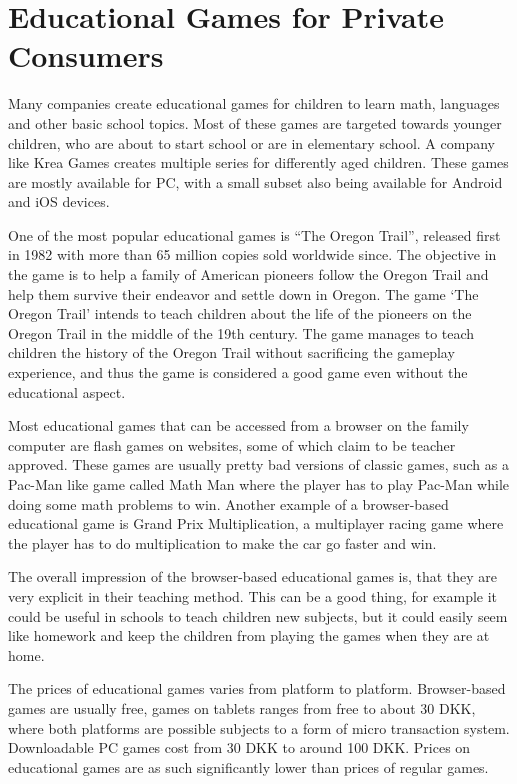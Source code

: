\section{Educational Games for Private Consumers}
\label{sec:privateconsumers}
Many companies create educational games for children to learn math, languages and other basic school topics. Most of these games are targeted towards younger children, who are about to start school or are in elementary school. A company like Krea Games \cite{kreagames} creates multiple series for differently aged children. These games are mostly available for PC, with a small subset also being available for Android and iOS devices.

One of the most popular educational games is ``The Oregon Trail'', released first in 1982 with more than 65 million copies sold worldwide since.\cite{oregontrail} The objective in the game is to help a family of American pioneers follow the Oregon Trail and help them survive their endeavor and settle down in Oregon.
The game `The Oregon Trail' intends to teach children about the life of the pioneers on the Oregon Trail in the middle of the 19th century. The game manages to teach children the history of the Oregon Trail without sacrificing the gameplay experience, and thus the game is considered a good game even without the educational aspect.

Most educational games that can be accessed from a browser on the family computer are flash games on websites, some of which claim to be teacher approved. These games are usually pretty bad versions of classic games, such as a Pac-Man like game called Math Man where the player has to play Pac-Man while doing some math problems to win.\cite{mathman} Another example of a browser-based educational game is Grand Prix Multiplication, a multiplayer racing game where the player has to do multiplication to make the car go faster and win.\cite{grandprix}

The overall impression of the browser-based educational games is, that they are very explicit in their teaching method. This can be a good thing, for example it could be useful in schools to teach children new subjects, but it could easily seem like homework and keep the children from playing the games when they are at home.

The prices of educational games varies from platform to platform. Browser-based games are usually free, games on tablets ranges from free to about 30 DKK, where both platforms are possible subjects to a form of micro transaction system. Downloadable PC games cost from 30 DKK to around 100 DKK. Prices on educational games are as such significantly lower than prices of regular games.